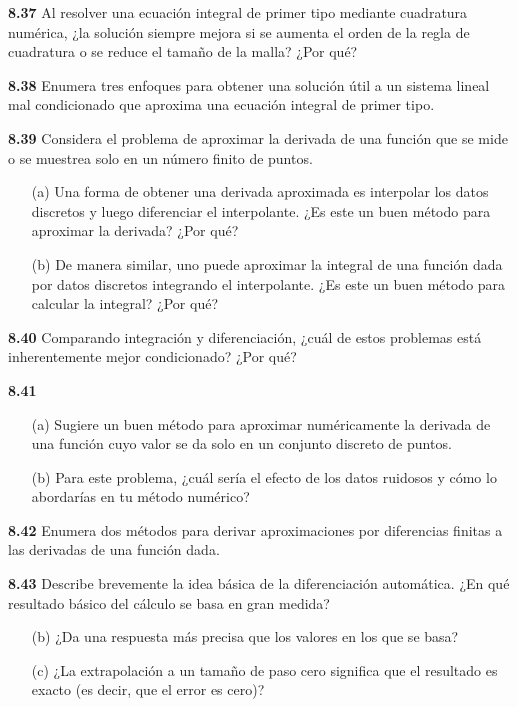 \documentclass{article}
\begin{document}
\textbf{8.37} Al resolver una ecuación integral de primer tipo mediante cuadratura numérica, ¿la solución siempre mejora si se aumenta el orden de la regla de cuadratura o se reduce el tamaño de la malla? ¿Por qué?

\textbf{8.38} Enumera tres enfoques para obtener una solución útil a un sistema lineal mal condicionado que aproxima una ecuación integral de primer tipo.

\textbf{8.39} Considera el problema de aproximar la derivada de una función que se mide o se muestrea solo en un número finito de puntos.
\begin{itemize}
    \item[(a)] Una forma de obtener una derivada aproximada es interpolar los datos discretos y luego diferenciar el interpolante. ¿Es este un buen método para aproximar la derivada? ¿Por qué?
    \item[(b)] De manera similar, uno puede aproximar la integral de una función dada por datos discretos integrando el interpolante. ¿Es este un buen método para calcular la integral? ¿Por qué?
\end{itemize}

\textbf{8.40} Comparando integración y diferenciación, ¿cuál de estos problemas está inherentemente mejor condicionado? ¿Por qué?

\textbf{8.41}
\begin{itemize}
    \item[(a)] Sugiere un buen método para aproximar numéricamente la derivada de una función cuyo valor se da solo en un conjunto discreto de puntos.
    \item[(b)] Para este problema, ¿cuál sería el efecto de los datos ruidosos y cómo lo abordarías en tu método numérico?
\end{itemize}

\textbf{8.42} Enumera dos métodos para derivar aproximaciones por diferencias finitas a las derivadas de una función dada.

\textbf{8.43} Describe brevemente la idea básica de la diferenciación automática. ¿En qué resultado básico del cálculo se basa en gran medida?
\begin{itemize}
    \item[(b)] ¿Da una respuesta más precisa que los valores en los que se basa?
    \item[(c)] ¿La extrapolación a un tamaño de paso cero significa que el resultado es exacto (es decir, que el error es cero)?
\end{itemize}
\end{document}
